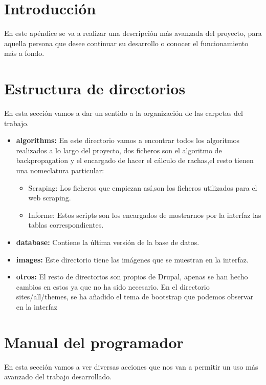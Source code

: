 
\section{Introducción}
En este apéndice se va a realizar una descripción más avanzada del proyecto, para aquella persona que desee continuar su desarrollo o conocer el funcionamiento más a fondo.

\section{Estructura de directorios}
En esta sección vamos a dar un sentido a la organización de las carpetas del trabajo.

\begin{itemize}

\item\textbf{algorithms:} En este directorio vamos a encontrar todos los algoritmos realizados a lo largo del proyecto, dos ficheros son el algoritmo de backpropagation y el encargado de hacer el cálculo de rachas,el resto tienen una nomeclatura particular:
\begin{itemize}
\item Scraping: Los ficheros que empiezan  así,son los ficheros utilizados para el web scraping.
\item Informe: Estos scripts son los encargados de mostrarnos por la interfaz las tablas correspondientes.
\end{itemize}
\item\textbf{database:} Contiene la última versión de la base de datos.

\item\textbf{images:} Este directorio tiene las imágenes que se muestran en la interfaz.

\item\textbf{otros:} El resto de directorios son propios de Drupal, apenas se han hecho cambios en estos ya que no ha sido necesario. En el directorio sites/all/themes, se ha añadido el tema de bootstrap que podemos observar en la interfaz
\end{itemize}

\section{Manual del programador}

En esta sección vamos a ver diversas acciones que nos van a permitir un uso más avanzado del trabajo desarrollado.

